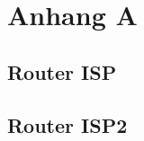 \section*{Anhang A}
\label{A}

\subsection*{Router ISP}
\begin{alltt}

\end{alltt}


\subsection*{Router ISP2}
\begin{alltt}

\end{alltt}
